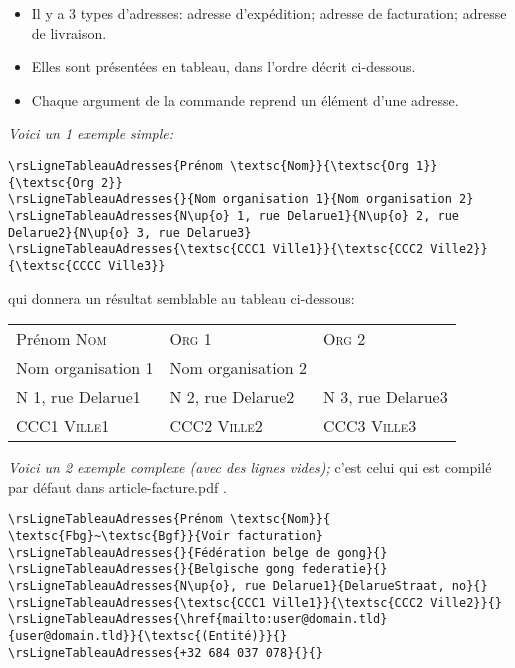 \documentclass[a4paper,10pt]{article}
\begin{document}
\begin{itemize}
    \item Il y a 3 types d'adresses: adresse d'expédition;  adresse de facturation;  adresse de livraison.
    \item Elles sont présentées en tableau, dans l'ordre décrit ci-dessous.
    \item Chaque argument de la commande reprend un élément d'une adresse.
\end{itemize}

\emph{Voici un 1 exemple simple:}
\begin{lstlisting}
\rsLigneTableauAdresses{Prénom \textsc{Nom}}{\textsc{Org 1}}{\textsc{Org 2}}
\rsLigneTableauAdresses{}{Nom organisation 1}{Nom organisation 2}
\rsLigneTableauAdresses{N\up{o} 1, rue Delarue1}{N\up{o} 2, rue Delarue2}{N\up{o} 3, rue Delarue3}
\rsLigneTableauAdresses{\textsc{CCC1 Ville1}}{\textsc{CCC2 Ville2}}{\textsc{CCCC Ville3}}
\end{lstlisting}

qui donnera un résultat semblable au tableau ci-dessous:
\begin{flushleft}
\begin{tabular}{p{}p{}p{}}
\hline
 Prénom \textsc{Nom} & \textsc{Org 1} & \textsc{Org 2}\\
 Nom organisation 1 & Nom organisation 2 &  \\
 N\up{o} 1, rue Delarue1 & N\up{o} 2, rue Delarue2 & N\up{o} 3, rue Delarue3\\
 \textsc{CCC1 Ville1} & \textsc{CCC2 Ville2} & \textsc{CCC3 Ville3}\\
\hline
\end{tabular}
\end{flushleft}


\emph{Voici un 2 exemple complexe (avec des lignes vides);} c'est celui qui est compilé par défaut dans \og article-facture.pdf \fg.
\begin{lstlisting}
\rsLigneTableauAdresses{Prénom \textsc{Nom}}{ \textsc{Fbg}~\textsc{Bgf}}{Voir facturation}
\rsLigneTableauAdresses{}{Fédération belge de gong}{}
\rsLigneTableauAdresses{}{Belgische gong federatie}{}
\rsLigneTableauAdresses{N\up{o}, rue Delarue1}{DelarueStraat, no}{}
\rsLigneTableauAdresses{\textsc{CCC1 Ville1}}{\textsc{CCC2 Ville2}}{}
\rsLigneTableauAdresses{\href{mailto:user@domain.tld}{user@domain.tld}}{\textsc{(Entité)}}{}
\rsLigneTableauAdresses{+32 684 037 078}{}{}
\end{lstlisting}
\end{document}
